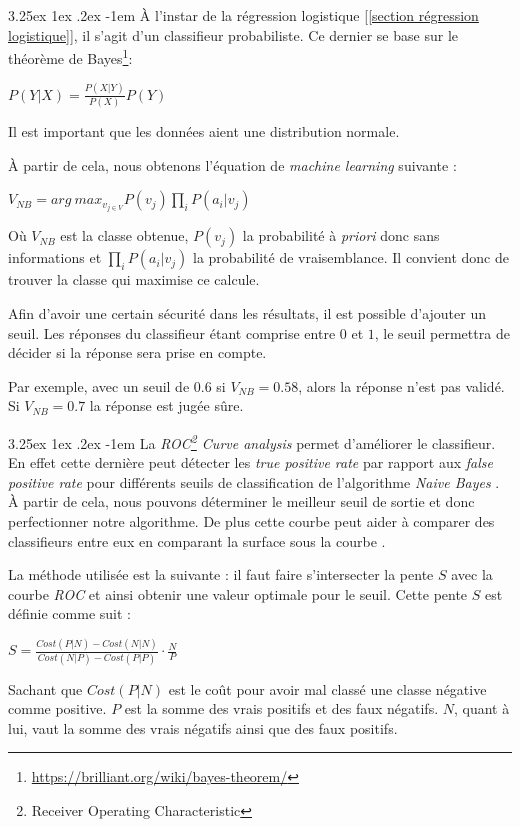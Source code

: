 \documentclass[a4paper, 11pt]{article}
\makeatletter
\renewcommand\paragraph{\@startsection{paragraph}{5}{\z@}%
  {3.25ex \@plus1ex \@minus.2ex}%
  {-1em}%
  {\normalfont\normalsize\bfseries}}
\makeatother
\begin{document}
\paragraph{}
À l'instar de la régression logistique [\ref{section régression logistique}], il s'agit d'un classifieur probabiliste. Ce dernier se base sur le théorème de Bayes\footnote{\url{https://brilliant.org/wiki/bayes-theorem/}}:
\begin{center}
$P(Y|X) = \frac{P(X|Y)}{P(X)}P(Y)$
\end{center}
Il est important que les données aient une distribution normale.

À partir de cela, nous obtenons l'équation de \textit{machine learning} suivante \cite{machine_learning_automated_trading}:
\begin{center}
$V_{NB} = arg\ max_{v_{j \in V}} P(v_j) \prod\limits_i P(a_i | v_j)$
\end{center}
Où $V_{NB}$ est la classe obtenue, $P(v_j)$ la probabilité à \textit{priori} donc sans informations et $\prod\limits_i P(a_i | v_j)$ la probabilité de vraisemblance.
Il convient donc de trouver la classe qui maximise ce calcule.

Afin d'avoir une certain sécurité dans les résultats, il est possible d'ajouter un seuil. Les réponses du classifieur étant comprise entre $0$ et $1$, le seuil permettra de décider si la réponse sera prise en compte.

Par exemple, avec un seuil de $0.6$ si $V_{NB} = 0.58$, alors la réponse n'est pas validé. Si $V_{NB} = 0.7$ la réponse est jugée sûre. 

\paragraph{}\label{section roc curve analysis}
La \textit{ROC\footnote{Receiver Operating Characteristic} Curve analysis} permet d'améliorer le classifieur. En effet cette dernière peut détecter les \textit{true positive rate} par rapport aux \textit{false positive rate} pour différents seuils de classification de l'algorithme \textit{Naive Bayes} \cite{machine_learning_automated_trading}. À partir de cela, nous pouvons déterminer le meilleur seuil de sortie et donc perfectionner notre algorithme.
De plus cette courbe peut aider à comparer des classifieurs entre eux en comparant la surface sous la courbe \cite{machine_learning_automated_trading}.

La méthode utilisée est la suivante \cite{machine_learning_automated_trading}: il faut faire s'intersecter la pente $S$ avec la courbe \textit{ROC} et ainsi obtenir une valeur optimale pour le seuil.
Cette pente $S$ est définie comme suit \cite{machine_learning_automated_trading}:
\begin{center}
$S = \frac{Cost(P|N) - Cost(N|N)}{Cost(N|P) - Cost(P|P)} \cdot \frac{N}{P}$
\end{center}
Sachant que $Cost(P|N)$ est le coût pour avoir mal classé une classe négative comme positive. $P$ est la somme des vrais positifs et des faux négatifs. $N$, quant à lui, vaut la somme des vrais négatifs ainsi que des faux positifs.
\end{document}
